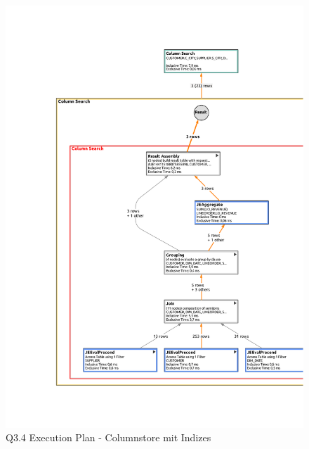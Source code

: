 \begin{figure}[H]
	\centering
	\includegraphics[width=\textwidth]{images/col_q34_index.pdf}
	\caption{Q3.4 Execution Plan - Columnstore mit Indizes}\label{exec:q34-col-index}
\end{figure}

